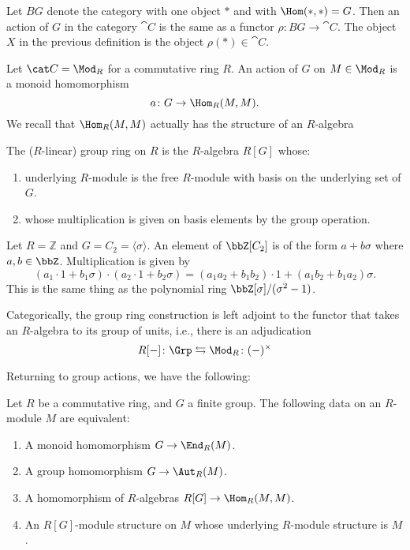 \documentclass{willowtreebook}
\begin{document}
\begin{remark}
    Let $BG$ denote the category with one object $\ast$ and with $\Hom(\ast,\ast) = G$. Then an action of $G$ in the category $\cat C$ is the same as a functor $\rho \colon BG \to \cat C$. The object $X$ in the previous definition is the object $\rho(\ast) \in \cat C$. 
\end{remark}
\begin{remark}
    Let $\cat C = \Mod_R$ for a commutative ring $R$. An action of $G$ on $M \in \Mod_R$ is a monoid homomorphism
    \[
a \colon G \to \Hom_R(M,M).
    \]
    We recall that $\Hom_R(M,M)$ actually has the structure of an $R$-algebra
\end{remark}
\begin{definition}
    The ($R$-linear) group ring on $R$ is the $R$-algebra $R[G]$ whose:
    \begin{enumerate}[label=(\alph*)]
    \item underlying $R$-module is the free $R$-module with basis on the underlying set of $G$. 
    \item whose multiplication is given on basis elements by the group operation. 
    \end{enumerate}
\end{definition}
\begin{example}
    Let $R = \mathbb{Z}$ and $G = C_2 = \langle \sigma \rangle$. An element of $\bbZ[C_2]$ is of the form $a + b\sigma$ where $a,b \in \bbZ$. Multiplication is given by
    \[
(a_1 \cdot 1+b_1\sigma)\cdot(a_2\cdot 1+b_2\sigma) = (a_1a_2+b_1b_2)\cdot 1  + (a_1b_2+b_1a_2)\sigma. 
    \]
    This is the same thing as the polynomial ring $\bbZ[\sigma]/(\sigma^2-1)$. 
\end{example}
\begin{remark}
    Categorically, the group ring construction is left adjoint to the functor that takes an $R$-algebra to its group of units, i.e., there is an adjudication
    \[
R[-] \colon \Grp \leftrightarrows \Mod_R \colon (-)^{
\times}
    \]
\end{remark}
Returning to group actions, we have the following:
\begin{proposition}
    Let $R$ be a commutative ring, and $G$ a finite group. The following data on an $R$-module $M$ are equivalent:
    \begin{enumerate}
        \item A monoid homomorphism $G \to \End_R(M)$.
        \item A group homomorphism $G \to \Aut_R(M)$. 
        \item A homomorphism of $R$-algebras $R[G] \to \Hom_R(M,M)$. 
        \item An $R[G]$-module structure on $M$ whose underlying $R$-module structure is $M$. 
    \end{enumerate}
\end{proposition}
\end{document}
